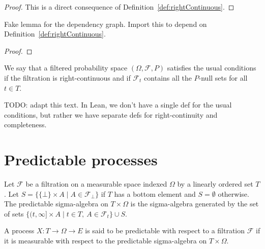 \begin{proof}\leanok
This is a direct consequence of Definition~\ref{def:rightContinuous}.
\end{proof}

\begin{lemma}\label{lem:rightContinuous_basic}
  \leanok
Fake lemma for the dependency graph. Import this to depend on Definition~\ref{def:rightContinuous}.
\end{lemma}

\begin{proof}\leanok

\end{proof}


\begin{definition}\label{def:hasUsualConditions}
  \leanok
We say that a filtered probability space $(\Omega, \mathcal{F}, P)$ satisfies the usual conditions if the filtration is right-continuous and if $\mathcal{F}_t$ contains all the $P$-null sets for all $t \in T$.
\end{definition}

TODO: adapt this text. In Lean, we don't have a single def for the usual conditions, but rather we have separate defs for right-continuity and completeness.




\section{Predictable processes}


\begin{definition}\label{def:predictableMeasurableSpace}
  \mathlibok
Let $\mathcal{F}$ be a filtration on a measurable space indexed $\Omega$ by a linearly ordered set $T$.
Let $S = \{\{\bot\} \times A \mid A \in \mathcal{F}_\bot\}$ if $T$ has a bottom element and $S = \emptyset$ otherwise.
The predictable sigma-algebra on $T \times \Omega$ is the sigma-algebra generated by the set of sets $\{(t, \infty] \times A \mid t \in T, \: A \in \mathcal{F}_t\} \cup S$.
\end{definition}


\begin{definition}\label{def:predictable}
  \mathlibok
A process $X : T \to \Omega \to E$ is said to be predictable with respect to a filtration $\mathcal{F}$ if it is measurable with respect to the predictable sigma-algebra on $T \times \Omega$.
\end{definition}


